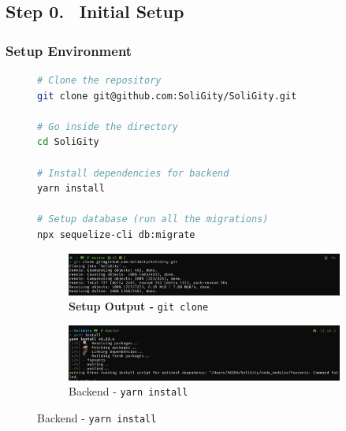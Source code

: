 \documentclass[12pt]{article}
\renewcommand{\_}{\kern-1.5pt\textunderscore\kern-1.5pt}
\begin{document}
\renewcommand\thesubsection{Step \arabic{subsection}.}
\renewcommand\thesubsubsection{\arabic{subsubsection}.}

\subsection*{Step 0. \(\;\;\)Initial Setup}

\subsubsection{Setup Environment}

\begin{figure}[H]
	\begin{minipage}[t]{0.4\linewidth}
		\begin{lstlisting}[language=bash]
# Clone the repository
git clone git@github.com:SoliGity/SoliGity.git

# Go inside the directory
cd SoliGity

# Install dependencies for backend
yarn install

# Setup database (run all the migrations)
npx sequelize-cli db:migrate
				\end{lstlisting}
	\end{minipage}\hfill
	\begin{minipage}[t]{0.5\linewidth}
		\centering
		\begin{subfigure}[b]{\textwidth}
			\captionsetup{justification   = raggedright,
              singlelinecheck = false}
			\centering
						\caption*{\textbf{Setup Output - }\texttt{git clone}}
			\includegraphics[width=\textwidth]{graphs/01. git_clone}
		\end{subfigure}
			\begin{subfigure}[b]{\textwidth}
				\captionsetup{justification   = raggedright,
              singlelinecheck = false}
			\centering
						\caption*{Backend - \texttt{yarn install}}

			\includegraphics[width=\textwidth]{graphs/02. yarn_install_backend}


\end{subfigure}
\end{minipage}
\end{figure}
\end{document}
